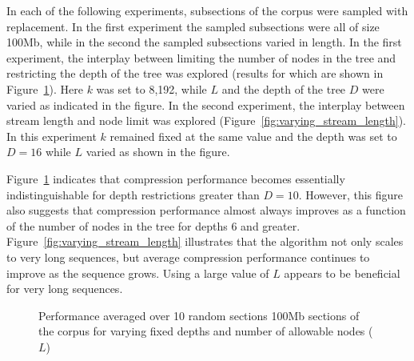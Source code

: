  In each of the following experiments, subsections of the corpus were sampled with replacement.  In the first experiment the sampled subsections were all of size 100Mb, while in the second the sampled subsections varied in length.  In the first experiment, the interplay between limiting the number of nodes in the tree and restricting the depth of the tree was explored (results for which are shown in Figure~\ref{fig:varying_depths}).  Here $k$ was set to 8,192, while $L$ and the depth of the tree $D$ were varied as indicated in the figure.  In the second experiment, the interplay between stream length and node limit was explored (Figure~\ref{fig:varying_stream_length}).  In this experiment $k$ remained fixed at the same value and the depth was set to $D=16$ while $L$ varied as shown in the figure.  

Figure~\ref{fig:varying_depths} indicates that compression performance becomes essentially indistinguishable for depth restrictions greater than $D=10$.  However, this figure also suggests that compression performance almost always improves as a function of the number of nodes in the tree for depths 6 and greater.  Figure~\ref{fig:varying_stream_length} illustrates that the algorithm not only scales to very long sequences, but average compression performance continues to improve as the sequence grows.  Using a large value of $L$ appears to be beneficial for very long sequences.

\begin{figure}[t] 
	\begin{center}
		\caption{Performance averaged over 10 random sections  100Mb sections of the corpus for varying fixed depths and number of allowable nodes ($L$) }
		\label{fig:varying_depths}
	\end{center} 
\end{figure} 


